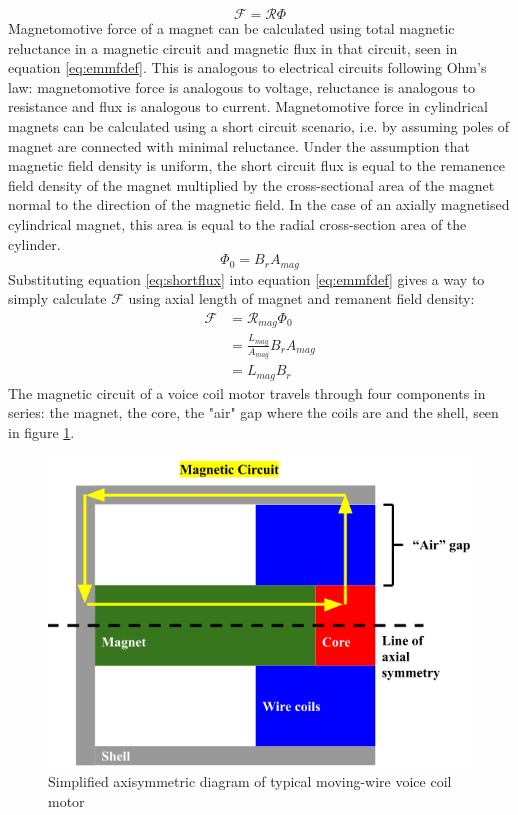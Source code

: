 \documentclass[a4paper,12pt]{article}
\begin{document}
\begin{equation} \label{eq:emmfdef}
\mathcal{F}=\mathcal{R} \Phi
\end{equation}
Magnetomotive force of a magnet can be calculated using total magnetic reluctance in a magnetic circuit and magnetic flux in that circuit, seen in equation \ref{eq:emmfdef}. This is analogous to electrical circuits following Ohm's law: magnetomotive force is analogous to voltage, reluctance is analogous to resistance and flux is analogous to current. Magnetomotive force in cylindrical magnets can be calculated using a short circuit scenario, i.e. by assuming poles of magnet are connected with minimal reluctance. Under the assumption that magnetic field density is uniform, the short circuit flux is equal to the remanence field density of the magnet multiplied by the cross-sectional area of the magnet normal to the direction of the magnetic field. In the case of an axially magnetised cylindrical magnet, this area is equal to the radial cross-section area of the cylinder.
\begin{equation}\label{eq:shortflux}
\Phi_0 = B_rA_{mag}
\end{equation}
Substituting equation \ref{eq:shortflux} into equation \ref{eq:emmfdef} gives a way to simply calculate $\mathcal{F}$ using axial length of magnet and remanent field density:
\begin{equation}\label{eq:emmf1}
\begin{split}
\mathcal{F} & = \mathcal{R}_{mag} \Phi_0\\
& = \frac{L_{mag}}{A_{mag}}B_r A_{mag}\\
& = L_{mag} B_r
\end{split}
\end{equation}
The magnetic circuit of a voice coil motor travels through four components in series: the magnet, the core, the "air" gap where the coils are and the shell, seen in figure \ref{fg:simplemotor}.
\begin{figure}[h!] 
	\centering
	\includegraphics[scale=0.4]{simplifiedMotor.png}
	\caption{Simplified axisymmetric diagram of typical moving-wire voice coil motor}
	\label{fg:simplemotor}
\end{figure}
\end{document}
